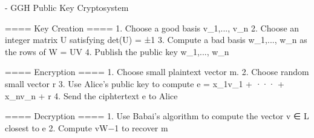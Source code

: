 
- GGH Public Key Cryptosystem

	==== Key Creation ====
1. Choose a good basis v_1,..., v_n
2. Choose an integer matrix U satisfying det(U) = ±1
3. Compute a bad basis w_1,..., w_n as the rows of W = UV
4. Publish the public key w_1,..., w_n


	==== Encryption ====
1. Choose small plaintext vector m.
2. Choose random small vector r
3. Use Alice’s public key to compute e = x_1v_1 + ··· + x_nv_n + r
4. Send the ciphtertext e to Alice


	==== Decryption ====
1. Use Babai’s algorithm to compute the vector v ∈ L closest to e
2. Compute vW−1 to recover m

